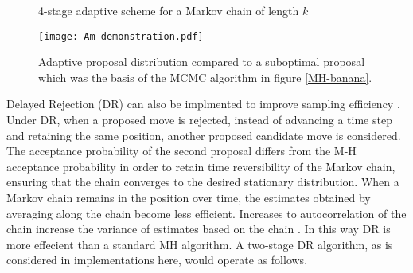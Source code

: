 \begin{figure}[h]
\begin{minipage}{1.0\linewidth}
\centering
\end{minipage}

\caption{4-stage adaptive scheme for a Markov chain of length $k$}
\label{4-stage-am}
\end{figure}

\begin{figure}[H]
	\centering
	\texttt{[image: Am-demonstration.pdf]}
	\caption{Adaptive proposal distribution compared to a suboptimal proposal which was the basis of the MCMC algorithm in figure \ref{MH-banana}.}
	\label{AM-demonstration}
\end{figure}

Delayed Rejection (DR) can also be implmented to improve sampling efficiency \citep{Mira2001}. Under DR, when a proposed move is rejected, instead of advancing a time step and retaining the same position, another proposed candidate move is considered. The acceptance probability of the second proposal differs from the M-H acceptance probability in order to retain time reversibility of the Markov chain, ensuring that the chain converges to the desired stationary distribution. When a Markov chain remains in the position over time, the estimates obtained by averaging along the chain become less efficient. Increases to autocorrelation of the chain increase the variance of estimates based on the chain \citep{Mira2001}. In this way DR is more effecient than a standard MH algorithm. A two-stage DR algorithm, as is considered in implementations here, would operate as follows. \\

